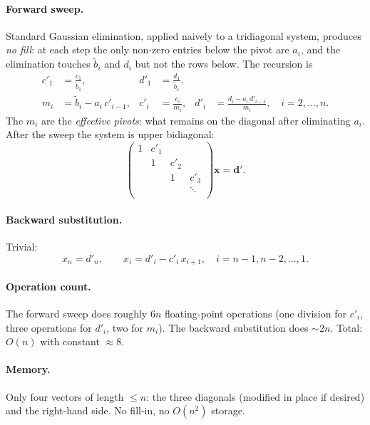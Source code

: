 \documentclass[11pt,a4paper]{article}
\begin{document}
\paragraph{Forward sweep.} Standard Gaussian elimination, applied
naively to a tridiagonal system, produces \emph{no fill}: at each
step the only non-zero entries below the pivot are $a_i$, and the
elimination touches $\tilde b_i$ and $d_i$ but not the rows below.
The recursion is
\begin{align}
c'_1 &= \frac{c_1}{\tilde b_1}, &
d'_1 &= \frac{d_1}{\tilde b_1}, \nonumber \\
m_i  &= \tilde b_i - a_i\,c'_{i-1}, &
c'_i &= \frac{c_i}{m_i}, &
d'_i &= \frac{d_i - a_i\,d'_{i-1}}{m_i}, \quad i = 2, \dots, n.
\label{eq:thomas-forward}
\end{align}
The $m_i$ are the \emph{effective pivots}: what remains on the
diagonal after eliminating $a_i$. After the sweep the system is
upper bidiagonal:
\[
\begin{pmatrix}
1 & c'_1 &       &       \\
  & 1    & c'_2  &       \\
  &      & 1     & c'_3  \\
  &      &       & \ddots \\
\end{pmatrix}
\mathbf{x} = \mathbf{d'}.
\]

\paragraph{Backward substitution.} Trivial:
\begin{equation}
x_n = d'_n, \qquad
x_i = d'_i - c'_i\,x_{i+1}, \quad i = n-1, n-2, \dots, 1.
\label{eq:thomas-back}
\end{equation}

\paragraph{Operation count.} The forward sweep does roughly $6n$
floating-point operations (one division for $c'_i$, three operations
for $d'_i$, two for $m_i$). The backward substitution does $\sim 2n$.
Total: $O(n)$ with constant $\approx 8$.

\paragraph{Memory.} Only four vectors of length $\le n$: the three
diagonals (modified in place if desired) and the right-hand side.
No fill-in, no $O(n^2)$ storage.
\end{document}
